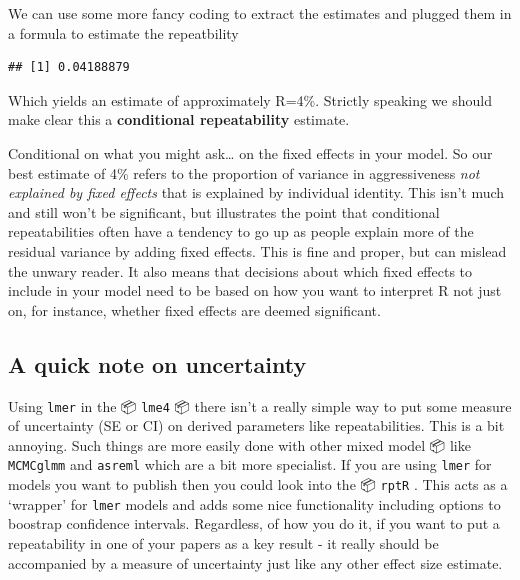 \documentclass[
  12pt,
]{book}
\newenvironment{Shaded}{\begin{snugshade}}{\end{snugshade}}
\newcommand{\DecValTok}[1]{\textcolor[rgb]{0.00,0.00,0.81}{#1}}
\newcommand{\KeywordTok}[1]{\textcolor[rgb]{0.13,0.29,0.53}{\textbf{#1}}}
\newcommand{\NormalTok}[1]{#1}
\newcommand{\OperatorTok}[1]{\textcolor[rgb]{0.81,0.36,0.00}{\textbf{#1}}}
\newcommand{\StringTok}[1]{\textcolor[rgb]{0.31,0.60,0.02}{#1}}
\begin{document}
We can use some more fancy coding to extract the estimates and plugged them in a formula to estimate the repeatbility

\begin{Shaded}
\end{Shaded}

\begin{verbatim}
## [1] 0.04188879
\end{verbatim}

Which yields an estimate of approximately R=4\%. Strictly speaking we should make clear this a \textbf{conditional repeatability} estimate.

Conditional on what you might ask\ldots{} on the fixed effects in your model. So our best estimate of 4\% refers to the proportion of variance in aggressiveness \emph{not explained by fixed effects} that is explained by individual identity. This isn't much and still won't be significant, but illustrates the point that conditional repeatabilities often have a tendency to go up as people explain more of the residual variance by adding fixed effects. This is fine and proper, but can mislead the unwary reader.
It also means that decisions about which fixed effects to include in your model need to be based on how you want to interpret R not just on, for instance, whether fixed effects are deemed significant.

\hypertarget{a-quick-note-on-uncertainty}{%
\subsection{A quick note on uncertainty}\label{a-quick-note-on-uncertainty}}

Using \texttt{lmer} in the 📦 \texttt{lme4} 📦 there isn't a really simple way to put some measure of uncertainty (SE or CI) on derived parameters like repeatabilities. This is a bit annoying. Such things are more easily done with other mixed model 📦 like \texttt{MCMCglmm} and \texttt{asreml} which are a bit more specialist. If you are using \texttt{lmer} for models you want to publish then you could look into the 📦 \texttt{rptR} \citep{R-rptR}. This acts as a `wrapper' for \texttt{lmer} models and adds some nice functionality including options to boostrap confidence intervals. Regardless, of how you do it, if you want to put a repeatability in one of your papers as a key result - it really should be accompanied by a measure of uncertainty just like any other effect size estimate.
\end{document}
